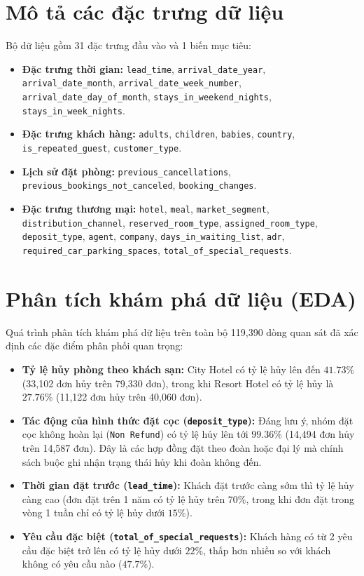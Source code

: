 \section{Mô tả các đặc trưng dữ liệu}
Bộ dữ liệu gồm 31 đặc trưng đầu vào và 1 biến mục tiêu:
\begin{itemize}
    \item \textbf{Đặc trưng thời gian:} \texttt{lead\_time}, \texttt{arrival\_date\_year}, \texttt{arrival\_date\_month}, \texttt{arrival\_date\_week\_number}, \texttt{arrival\_date\_day\_of\_month}, \texttt{stays\_in\_weekend\_nights}, \texttt{stays\_in\_week\_nights}.
    \item \textbf{Đặc trưng khách hàng:} \texttt{adults}, \texttt{children}, \texttt{babies}, \texttt{country}, \texttt{is\_repeated\_guest}, \texttt{customer\_type}.
    \item \textbf{Lịch sử đặt phòng:} \texttt{previous\_cancellations}, \texttt{previous\_bookings\_not\_canceled}, \texttt{booking\_changes}.
    \item \textbf{Đặc trưng thương mại:} \texttt{hotel}, \texttt{meal}, \texttt{market\_segment}, \texttt{distribution\_channel}, \texttt{reserved\_room\_type}, \texttt{assigned\_room\_type}, \texttt{deposit\_type}, \texttt{agent}, \texttt{company}, \texttt{days\_in\_waiting\_list}, \texttt{adr}, \texttt{required\_car\_parking\_spaces}, \texttt{total\_of\_special\_requests}.
\end{itemize}

\section{Phân tích khám phá dữ liệu (EDA)}
Quá trình phân tích khám phá dữ liệu trên toàn bộ 119,390 dòng quan sát đã xác định các đặc điểm phân phối quan trọng:
\begin{itemize}
    \item \textbf{Tỷ lệ hủy phòng theo khách sạn:} City Hotel có tỷ lệ hủy lên đến $41.73\%$ (33,102 đơn hủy trên 79,330 đơn), trong khi Resort Hotel có tỷ lệ hủy là $27.76\%$ (11,122 đơn hủy trên 40,060 đơn).
    \item \textbf{Tác động của hình thức đặt cọc (\texttt{deposit\_type}):} Đáng lưu ý, nhóm đặt cọc không hoàn lại (\texttt{Non Refund}) có tỷ lệ hủy lên tới $99.36\%$ (14,494 đơn hủy trên 14,587 đơn). Đây là các hợp đồng đặt theo đoàn hoặc đại lý mà chính sách buộc ghi nhận trạng thái hủy khi đoàn không đến.
    \item \textbf{Thời gian đặt trước (\texttt{lead\_time}):} Khách đặt trước càng sớm thì tỷ lệ hủy càng cao (đơn đặt trên 1 năm có tỷ lệ hủy trên $70\%$, trong khi đơn đặt trong vòng 1 tuần chỉ có tỷ lệ hủy dưới $15\%$).
    \item \textbf{Yêu cầu đặc biệt (\texttt{total\_of\_special\_requests}):} Khách hàng có từ 2 yêu cầu đặc biệt trở lên có tỷ lệ hủy dưới $22\%$, thấp hơn nhiều so với khách không có yêu cầu nào ($47.7\%$).
\end{itemize}


